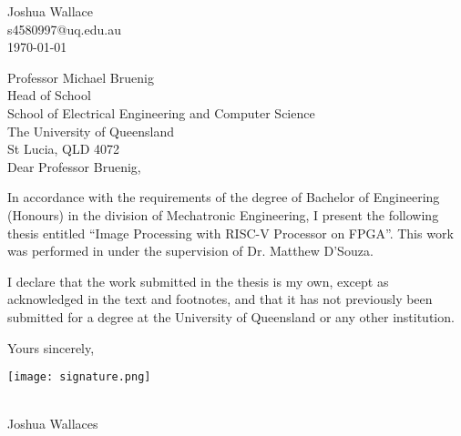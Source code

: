 \fancyhf{}

\begin{flushright}
	Joshua Wallace\\
	s4580997@uq.edu.au\\
	\medskip
	\today
\end{flushright}

\begin{flushleft}
  Professor Michael Bruenig\\
  Head of School\\
  School of Electrical Engineering and Computer Science\\
  The University of Queensland\\
  St Lucia, QLD 4072\\
  \bigskip\bigskip
  Dear Professor Bruenig,
\end{flushleft}

\noindent
In accordance with the requirements of the degree of Bachelor of
Engineering (Honours) in the division of Mechatronic Engineering,
I present the following thesis entitled “Image Processing with RISC-V Processor on FPGA”.
This work was performed in under the supervision of
Dr. Matthew D'Souza. 

I declare that the work submitted in the thesis is my own, 
except as acknowledged in the text and footnotes, and that it has
not previously been submitted for a degree at the University of 
Queensland or any other institution.\bigskip \bigskip

\begin{flushright}
    Yours sincerely,\\
    \medskip
	
    \begin{minipage}[t]{4cm}
        \begin{flushright}
            \texttt{[image: signature.png]}
        \end{flushright}
    \end{minipage}\\
	\vspace{-0.2cm}
    Joshua Wallaces
\end{flushright}

\clearpage